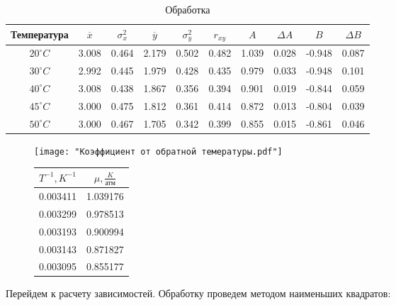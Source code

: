 \documentclass[12pt,a4paper]{article}
\begin{document}
\begin{table}
	
	\caption{Обработка}
	\label{tab:stat}
	\centering
	\footnotesize
	\begin{tabular}{|c|c|c|c|c|c|c|c|c|c|}
		\hline
		Температура& $\overline{x}$ & $\sigma_x^2$ & $\overline{y}$ & $\sigma_y^2$ & $r_{xy}$ & $A$ & $\Delta A$ & $B$ & $\Delta B$ \\ \hline
		$20^\circ C$ & 3.008 & 0.464 & 2.179 & 0.502 & 0.482 & 1.039 & 0.028 & -0.948 & 0.087 \\ \hline
		$30^\circ C$ & 2.992 & 0.445 & 1.979 & 0.428 & 0.435 & 0.979 & 0.033 & -0.948 & 0.101 \\ \hline
		$40^\circ C$ & 3.008 & 0.438 & 1.867 & 0.356 & 0.394 & 0.901 & 0.019 & -0.844 & 0.059 \\ \hline
		$45^\circ C$ & 3.000 & 0.475 & 1.812 & 0.361 & 0.414 & 0.872 & 0.013 & -0.804 & 0.039 \\ \hline
		$50^\circ C$ & 3.000 & 0.467 & 1.705 & 0.342 & 0.399 & 0.855 & 0.015 & -0.861 & 0.046 \\ \hline
	\end{tabular}
\end{table}

\begin{figure}\CenterFloatBoxes
	\begin{floatrow}
		{
			
			\texttt{[image: "Коэффициент от обратной темературы.pdf"]}
			
		}
		\killfloatstyle\ttabbox[\Xhsize]
		{\caption{} \label{tab:pkal}}
		{	\footnotesize
			
			\begin{tabular}{|c|c|}
				\hline
				$T^{-1}, K^{-1}$ & $\mu, \frac{K}{\text{атм}}$ \\ \hline
				0.003411 & 1.039176 \\ \hline
				0.003299 & 0.978513 \\ \hline
				0.003193 & 0.900994 \\ \hline
				0.003143 & 0.871827 \\ \hline
				0.003095 & 0.855177 \\ \hline
			\end{tabular}
			
		}
	\end{floatrow}
\end{figure}
Перейдем к расчету зависимостей. Обработку проведем методом наименьших квадратов:
\end{document}
